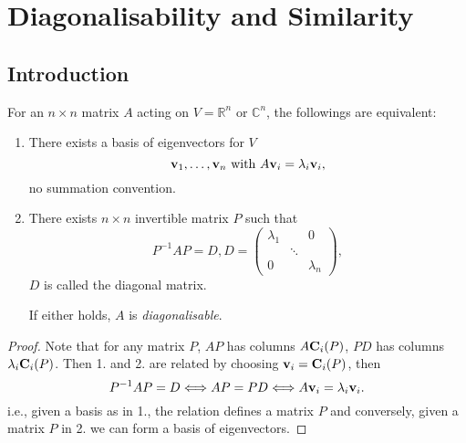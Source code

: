 \documentclass[10pt]{article}
\begin{document}
    \section{Diagonalisability and Similarity}
    \subsection{Introduction}
    \begin{proposition}\label{prop:conditions for diag}
        For an $n\times n$ matrix $A$ acting on $V=\mathbb{R}^{n}$ or $ \mathbb{C}^{n} $, the followings are equivalent:
        \begin{enumerate}
            \item There exists a basis of eigenvectors for $V$
            \[
                {\bf v}_1,\dots,{\bf v}_n \text{ with }A{\bf v}_i=\lambda_i{\bf v}_i
            ,\]
            no summation convention.
            \item There exists $n\times n$ invertible matrix $P$ such that 
            \[
                P^{-1}AP=D, D=\begin{pmatrix}
                    \lambda_1&&0\\
                    &\ddots&\\
                    0&&\lambda_n
                \end{pmatrix}
            ,\]
            $D$ is called the diagonal matrix.

            If either holds, $A$ is \textit{diagonalisable}.
        \end{enumerate} 
    \end{proposition}
    \begin{proof}
        Note that for any matrix $P$, $AP$ has columns $ A{\bf C}_i(P) $, $PD$ has columns $ \lambda_i {\bf C}_i(P) $. Then 1. and 2. are related by choosing $ {\bf v}_i={\bf C}_i(P) $, then 
        \[
            P^{-1}AP=D \Longleftrightarrow AP=PD \Longleftrightarrow A{\bf v}_i=\lambda_i{\bf v}_i
        .\]
        i.e., given a basis as in 1., the relation defines a matrix $P$ and conversely, given a matrix $P$ in 2. we can form a basis of eigenvectors.
    \end{proof}
\end{document}
